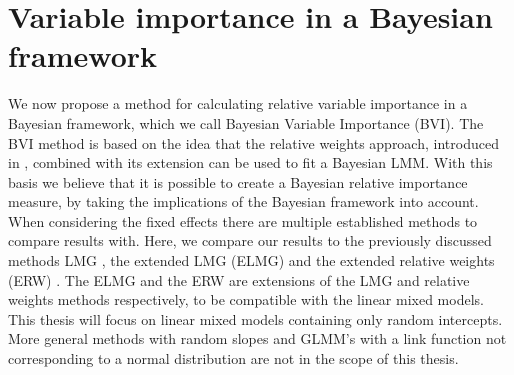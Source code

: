 \section{Variable importance in a Bayesian framework}
\label{sec:implementation}
We now propose a method for calculating relative variable importance in a Bayesian framework, which we call Bayesian Variable Importance (BVI). 
The BVI method is based on the idea that the relative weights approach, introduced in , combined with its extension \citep{matre} can be used to fit a Bayesian LMM.
With this basis we believe that it is possible to create a Bayesian relative importance measure, by taking the implications of the Bayesian framework into account.
When considering the fixed effects there are multiple established methods to compare results with. Here, we compare our results to the previously discussed methods LMG \citep{gromping_relaimpo}, the extended LMG (ELMG) and the extended relative weights (ERW) \citep{matre}.
The ELMG and the ERW are extensions of the LMG and relative weights methods respectively, to be compatible with the linear mixed models.
This thesis will focus on linear mixed models containing only random intercepts. 
More general methods with random slopes and GLMM's with a link function not corresponding to a normal distribution are not in the scope of this thesis.

